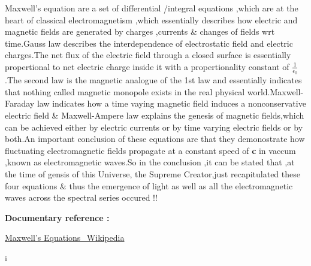Maxwell's equation are a set of differential /integral equations ,which are at the heart of classical electromagnetism ,which essentially describes how electric and magnetic fields are generated by charges ,currents \& changes of fields wrt time.Gauss law describes the interdependence of electrostatic field and electric charges.The net flux of the electric field through a closed surface is essentially propertional to net electric charge inside it with a propertionality constant of $ \frac{1}{\epsilon_{0}} $.The second law is the magnetic analogue of the 1st law and essentially indicates that nothing called magnetic monopole exists in the real physical world.Maxwell-Faraday law indicates how a time vaying magnetic field induces a nonconservative electric field \& Maxwell-Ampere law explains the genesis of magnetic fields,which can be achieved either by electric currents or by time varying electric fields or by both.An important conclusion of these equations are that they demonostrate how fluctuating electromagnetic fields propagate at a constant speed of {\bf{c}} in vaccum ,known as electromagnetic waves.So in the conclusion ,it can be stated that ,at the time of gensis of this Universe, the Supreme Creator,just recapitulated these four equations \& thus the emergence of light as well as all the electromagnetic waves across the spectral series occured !!


\bf{Documentary reference :}


\href{https://en.wikipedia.org/wiki/Maxwell\%27s\_equations}{Maxwell's Equations\_Wikipedia}

i
